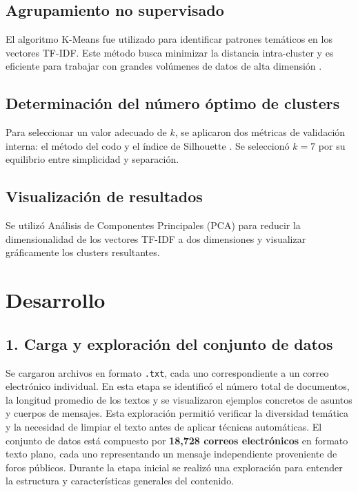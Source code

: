 \documentclass[journal]{IEEEtran}
\begin{document}
\subsection{Agrupamiento no supervisado}
El algoritmo K-Means fue utilizado para identificar patrones temáticos en los vectores TF-IDF. Este método busca minimizar la distancia intra-cluster y es eficiente para trabajar con grandes volúmenes de datos de alta dimensión \cite{lloyd1982least}.

\subsection{Determinación del número óptimo de clusters}
Para seleccionar un valor adecuado de $k$, se aplicaron dos métricas de validación interna: el método del codo y el índice de Silhouette \cite{rousseeuw1987silhouettes}. Se seleccionó $k=7$ por su equilibrio entre simplicidad y separación.

\subsection{Visualización de resultados}
Se utilizó Análisis de Componentes Principales (PCA) para reducir la dimensionalidad de los vectores TF-IDF a dos dimensiones y visualizar gráficamente los clusters resultantes.

\section{Desarrollo}

\subsection*{1. Carga y exploración del conjunto de datos}

Se cargaron archivos en formato \texttt{.txt}, cada uno correspondiente a un correo electrónico individual. En esta etapa se identificó el número total de documentos, la longitud promedio de los textos y se visualizaron ejemplos concretos de asuntos y cuerpos de mensajes. Esta exploración permitió verificar la diversidad temática y la necesidad de limpiar el texto antes de aplicar técnicas automáticas.
\vspace{12pt}
El conjunto de datos está compuesto por \textbf{18,728 correos electrónicos} en formato texto plano, cada uno representando un mensaje independiente proveniente de foros públicos. Durante la etapa inicial se realizó una exploración para entender la estructura y características generales del contenido.
\end{document}
